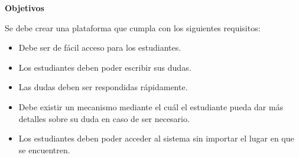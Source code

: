 \textbf{Objetivos}
\newline

Se debe crear una plataforma que cumpla con los siguientes requisitos:
\begin{itemize}
	\item Debe ser de fácil acceso para los estudiantes.
	
	\item Los estudiantes deben poder escribir sus dudas.
	
	\item Las dudas deben ser respondidas rápidamente.
	
	\item Debe existir un mecanismo mediante el cuál el estudiante pueda dar más detalles sobre su duda en caso de ser necesario.
	
	\item Los estudiantes deben poder acceder al sistema sin importar el lugar en que se encuentren.
\end{itemize}